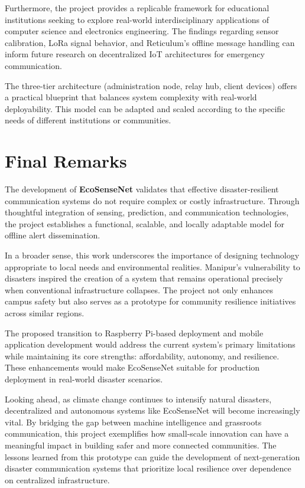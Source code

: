 Furthermore, the project provides a replicable framework for educational institutions seeking to explore real-world interdisciplinary applications of computer science and electronics engineering. The findings regarding sensor calibration, LoRa signal behavior, and Reticulum's offline message handling can inform future research on decentralized IoT architectures for emergency communication.

The three-tier architecture (administration node, relay hub, client devices) offers a practical blueprint that balances system complexity with real-world deployability. This model can be adapted and scaled according to the specific needs of different institutions or communities.

\section{Final Remarks}
The development of \textbf{EcoSenseNet} validates that effective disaster-resilient communication systems do not require complex or costly infrastructure. Through thoughtful integration of sensing, prediction, and communication technologies, the project establishes a functional, scalable, and locally adaptable model for offline alert dissemination.

In a broader sense, this work underscores the importance of designing technology appropriate to local needs and environmental realities. Manipur's vulnerability to disasters inspired the creation of a system that remains operational precisely when conventional infrastructure collapses. The project not only enhances campus safety but also serves as a prototype for community resilience initiatives across similar regions.

The proposed transition to Raspberry Pi-based deployment and mobile application development would address the current system's primary limitations while maintaining its core strengths: affordability, autonomy, and resilience. These enhancements would make EcoSenseNet suitable for production deployment in real-world disaster scenarios.

Looking ahead, as climate change continues to intensify natural disasters, decentralized and autonomous systems like EcoSenseNet will become increasingly vital. By bridging the gap between machine intelligence and grassroots communication, this project exemplifies how small-scale innovation can have a meaningful impact in building safer and more connected communities. The lessons learned from this prototype can guide the development of next-generation disaster communication systems that prioritize local resilience over dependence on centralized infrastructure.
